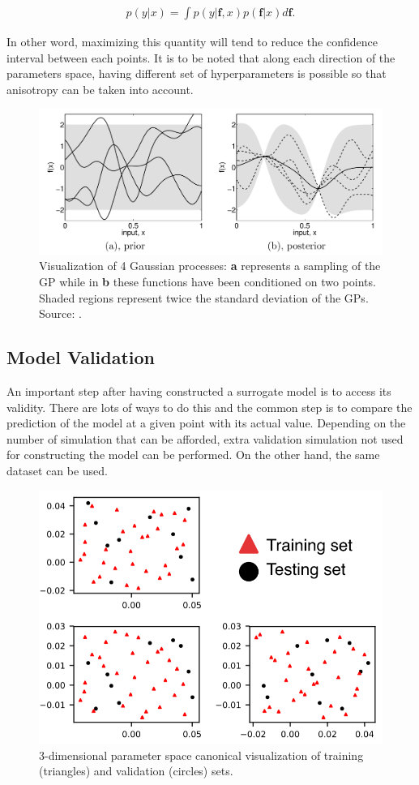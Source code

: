\begin{align}
p(y|x) = \int p(y|\mathbf{f}, x)p(\mathbf{f}|x)d\mathbf{f}.
\end{align}

\noindent In other word, maximizing this quantity will tend to reduce the confidence interval between each points. It is to be noted that along each direction of the parameters space, having different set of hyperparameters  is possible so that anisotropy can be taken into account.

\begin{figure}[H]
\centering
\includegraphics[width=0.9\linewidth,keepaspectratio]{fig/literature/rasmussenGP.png}
\caption{Visualization of 4 Gaussian processes: \textbf{a} represents a sampling of the GP while in \textbf{b} these functions have been conditioned on two points. Shaded regions represent twice the standard deviation of the GPs. Source: \cite{rasmussen2006}.}
\label{fig:gp_prior-post}
\end{figure}



\subsection{Model Validation}\label{sec:validation}

An important step after having constructed a surrogate model is to access its validity. There are lots of ways to do this and the common step is to compare the prediction of the model at a given point with its actual value. Depending on the number of simulation that can be afforded, extra validation simulation not used for constructing the model can be performed. On the other hand, the same dataset can be used.

\begin{figure}[H]
\centering
\includegraphics[width=0.6\linewidth,keepaspectratio]{fig/literature/validation_set.png}
\caption{3-dimensional parameter space canonical visualization of training (triangles) and validation (circles) sets.}
\label{fig:validation}
\end{figure}

